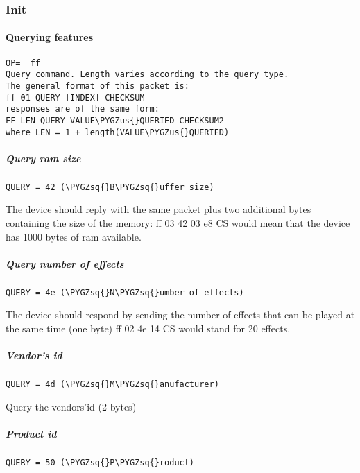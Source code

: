\documentclass[a4paper,8pt,english]{sphinxmanual}
\def\PYGZus{\char`\_}
\def\PYGZsq{\char`\'}
\renewcommand\PYGZsq{\textquotesingle}
\begin{document}
\subsubsection{Init}
\label{input/devices/iforce-protocol:init}

\paragraph{Querying features}
\label{input/devices/iforce-protocol:querying-features}
\begin{Verbatim}[commandchars=\\\{\}]
OP=  ff
Query command. Length varies according to the query type.
The general format of this packet is:
ff 01 QUERY [INDEX] CHECKSUM
responses are of the same form:
FF LEN QUERY VALUE\PYGZus{}QUERIED CHECKSUM2
where LEN = 1 + length(VALUE\PYGZus{}QUERIED)
\end{Verbatim}


\subparagraph{Query ram size}
\label{input/devices/iforce-protocol:query-ram-size}
\begin{Verbatim}[commandchars=\\\{\}]
QUERY = 42 (\PYGZsq{}B\PYGZsq{}uffer size)
\end{Verbatim}

The device should reply with the same packet plus two additional bytes
containing the size of the memory:
ff 03 42 03 e8 CS would mean that the device has 1000 bytes of ram available.


\subparagraph{Query number of effects}
\label{input/devices/iforce-protocol:query-number-of-effects}
\begin{Verbatim}[commandchars=\\\{\}]
QUERY = 4e (\PYGZsq{}N\PYGZsq{}umber of effects)
\end{Verbatim}

The device should respond by sending the number of effects that can be played
at the same time (one byte)
ff 02 4e 14 CS would stand for 20 effects.


\subparagraph{Vendor's id}
\label{input/devices/iforce-protocol:vendor-s-id}
\begin{Verbatim}[commandchars=\\\{\}]
QUERY = 4d (\PYGZsq{}M\PYGZsq{}anufacturer)
\end{Verbatim}

Query the vendors'id (2 bytes)


\subparagraph{Product id}
\label{input/devices/iforce-protocol:product-id}
\begin{Verbatim}[commandchars=\\\{\}]
QUERY = 50 (\PYGZsq{}P\PYGZsq{}roduct)
\end{Verbatim}
\end{document}
